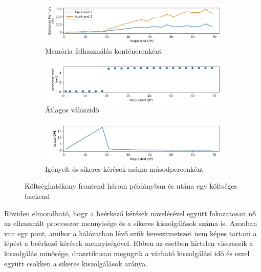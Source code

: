\begin{figure}
\hfill
\begin{subfigure}{\textwidth}
    \includegraphics[width=\textwidth]{figures/3FE-1BE-stack/container-mem.png}
    \caption{Memória felhasználás konténerenként}
    \label{subfig:container-mem}
\end{subfigure}

\hfill
\begin{subfigure}{\textwidth}
    \includegraphics[width=\textwidth]{figures/3FE-1BE-stack/resp-time.png}
    \caption{Átlagos válaszidő}
    \label{subfig:resp-time}
\end{subfigure}

\hfill
\begin{subfigure}{\textwidth}
    \includegraphics[width=\textwidth]{figures/3FE-1BE-stack/actual-qps.png}
    \caption{Igényelt és sikeres kérések száma másodpercenként}
    \label{subfig:actual-qps}
\end{subfigure}
        
\caption{Költséghatékony frontend három példányban és utána egy költséges backend}
\label{fig:3FE_stack_1BE}
\end{figure}

Röviden elmondható, hogy a beérkező kérések növelésével együtt fokozatosan nő az elhasznált processzor mennyisége és a sikeres kiszolgálások száma is.
Azonban van egy pont, amikor a hálózatban lévő szűk keresztmetszet nem képes tartani a lépést a beérkező kérések mennyiségével. 
Ebben az esetben hirtelen visszaesik a kiszolgálás minősége, drasztikusan megugrik a várható kiszolgálási idő és ezzel együtt csökken a sikeres kiszolgálások aránya.


